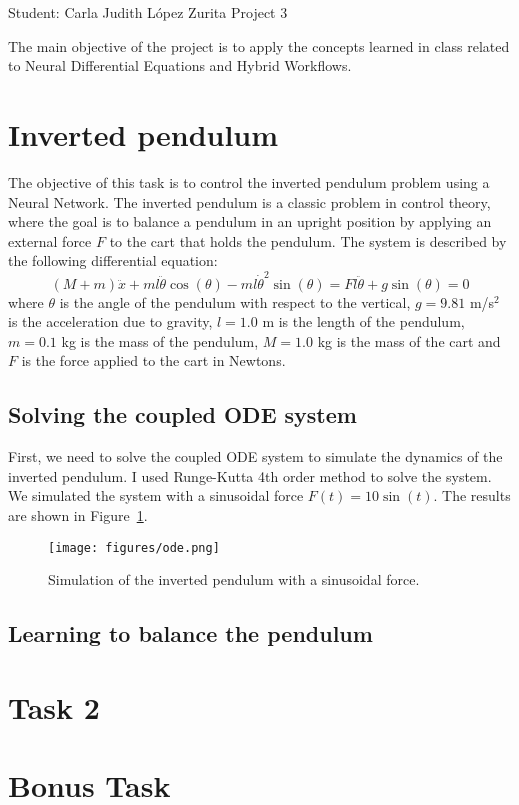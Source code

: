 \documentclass[unicode,11pt,a4paper,oneside,numbers=endperiod,openany]{scrartcl}
\begin{document}
\setassignment
{}

            {Student: Carla Judith L\'opez Zurita}
            {}{Project 3}{}
\newline

The main objective of the project is to apply the concepts learned in class
related to Neural Differential Equations and Hybrid Workflows.


\section{Inverted pendulum}\label{sec:task1}
The objective of this task is to control the inverted pendulum problem using a
Neural Network. The inverted pendulum is a classic problem in control theory,
where the goal is to balance a pendulum in an upright position by applying an 
external force $F$ to the cart that holds the pendulum. 
The system is described by the following differential equation:
\begin{equation}
    (M+m) \ddot{x} + m l \ddot{\theta} \cos(\theta) - m l \dot{\theta}^2 \sin(\theta) = F
    l \ddot{\theta} + g \sin(\theta) = 0
\end{equation}
where $\theta$ is the angle of the pendulum with respect to the vertical,
$g=9.81$ m/s$^2$ is
the acceleration due to gravity, $l=1.0$ m is the length of the pendulum,
$m=0.1$ kg is the
mass of the pendulum, $M=1.0$ kg is the mass of the cart and $F$ is the force
applied to the cart in Newtons.

\subsection*{Solving the coupled ODE system}
First, we need to solve the coupled ODE system to simulate the dynamics of the
inverted pendulum. I used Runge-Kutta 4th order method to solve the system.
We simulated the system with a sinusoidal force $F(t) = 10 \sin(t)$.
The results are shown in Figure~\ref{fig:ode}.
\begin{figure}[h]
    \centering
    \texttt{[image: figures/ode.png]}
    \caption{Simulation of the inverted pendulum with a sinusoidal force.}
    \label{fig:ode}
\end{figure}

\subsection*{Learning to balance the pendulum}

\section{Task 2}\label{sec:task2}


\section{Bonus Task}\label{sec:task3}




\end{document}

